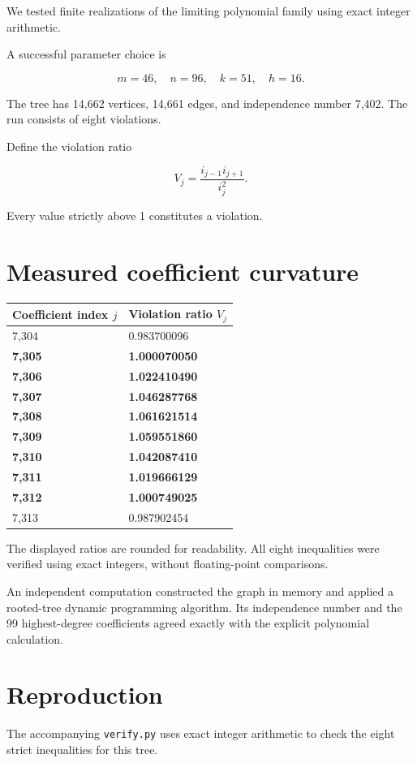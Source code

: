 \documentclass[11pt]{article}
\begin{document}
We tested finite realizations of the limiting polynomial family using exact integer arithmetic.

A successful parameter choice is

\[
\boxed{
m=46,\quad n=96,\quad k=51,\quad h=16.
}
\]

The tree has 14,662 vertices, 14,661 edges, and independence number 7,402. The run consists of eight violations.

Define the violation ratio

\[
V_j=\frac{i_{j-1}i_{j+1}}{i_j^2}.
\]

Every value strictly above 1 constitutes a violation.

\section{Measured coefficient curvature}

\begin{center}
\small
\begin{tabular}{ll}
Coefficient index \(j\) & Violation ratio \(V_j\) \\
\hline
7,304 & 0.983700096 \\
\textbf{7,305} & \textbf{1.000070050} \\
\textbf{7,306} & \textbf{1.022410490} \\
\textbf{7,307} & \textbf{1.046287768} \\
\textbf{7,308} & \textbf{1.061621514} \\
\textbf{7,309} & \textbf{1.059551860} \\
\textbf{7,310} & \textbf{1.042087410} \\
\textbf{7,311} & \textbf{1.019666129} \\
\textbf{7,312} & \textbf{1.000749025} \\
7,313 & 0.987902454 \\
\end{tabular}
\end{center}

The displayed ratios are rounded for readability. All eight inequalities were verified using exact integers, without floating-point comparisons.

An independent computation constructed the graph in memory and applied a rooted-tree dynamic programming algorithm. Its independence number and the 99 highest-degree coefficients agreed exactly with the explicit polynomial calculation.

\section{Reproduction}
The accompanying \texttt{verify.py} uses exact integer arithmetic to check the eight strict inequalities for this tree.
\end{document}
